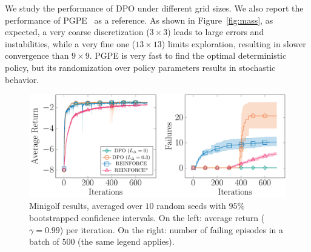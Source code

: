 \newline
We study the performance of \ac{DPO} under different grid sizes. We also report the performance of \ac{PGPE}~\citep{sehnke2008policy} as a reference. As shown in Figure~\ref{fig:mass}, as expected, a very coarse discretization ($3\times3$) leads to large errors and instabilities, while a very fine one ($13\times13$) limits exploration, resulting in slower convergence than $9\times9$. \ac{PGPE} is very fast to find the optimal deterministic policy, but its randomization over policy parameters results in stochastic behavior.
%
\begin{figure}[t]
	\includegraphics[width=\columnwidth]{plots/minigolf.pdf}
	\caption{Minigolf results, averaged over $10$ random seeds with $95\%$ bootstrapped confidence intervals. On the left: average return ($\gamma=0.99$) per iteration. On the right: number of failing episodes in a batch of $500$ (the same legend applies).}
	\label{fig:minigolf}
\end{figure}

